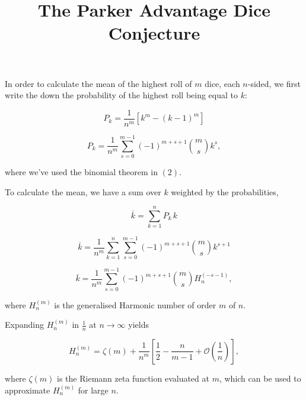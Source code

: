 \documentclass[12pt]{article}
\title{The Parker Advantage Dice Conjecture}
\author{}
\date{}
\begin{document}
\maketitle
\vspace{-0.8em}

In order to calculate the mean of the highest roll of $m$ dice, each $n$-sided, we first write the down the probability of the highest roll being equal to $k$:

\begin{equation}
    P_k
    = \frac{1}{n^m} \left[k^m - {\left(k - 1\right)}^m\right]
\end{equation}

\begin{equation}
    P_k
    = \frac{1}{n^m} \sum_{s=0}^{m-1} {\left(-1\right)}^{m+s+1} \binom{m}{s} k^s,
\end{equation}

where we've used the binomial theorem in $(2)$.
\newline

To calculate the mean, we have a sum over $k$ weighted by the probabilities,

\begin{equation}
    \overline{k}
    = \sum_{k=1}^n P_k \, k
\end{equation}

\begin{equation}
    \overline{k}
    = \frac{1}{n^m} \sum_{k=1}^n \sum_{s=0}^{m-1} {\left(-1\right)}^{m+s+1} \binom{m}{s} k^{s+1}
\end{equation}

\begin{equation}
    \overline{k}
    = \frac{1}{n^m} \sum_{s=0}^{m-1} {\left(-1\right)}^{m+s+1} \binom{m}{s} H_n^{\left(-s-1\right)},
\end{equation}

where $H_n^{\left(m\right)}$ is the generalised Harmonic number of order $m$ of $n$.
\newline

Expanding $H_n^{\left(m\right)}$ in $\frac{1}{n}$ at $n \to \infty$ yields

\begin{equation}
    H_n^{\left(m\right)}
    = \zeta \left(m\right) + \frac{1}{n^m} \left[\frac{1}{2} - \frac{n}{m-1} + \mathcal{O} \left(\frac{1}{n}\right)\right],
\end{equation}

where $\zeta \left(m\right)$ is the Riemann zeta function evaluated at $m$, which can be used to approximate $H_n^{\left(m\right)}$ for large $n$.
\newline
\end{document}
